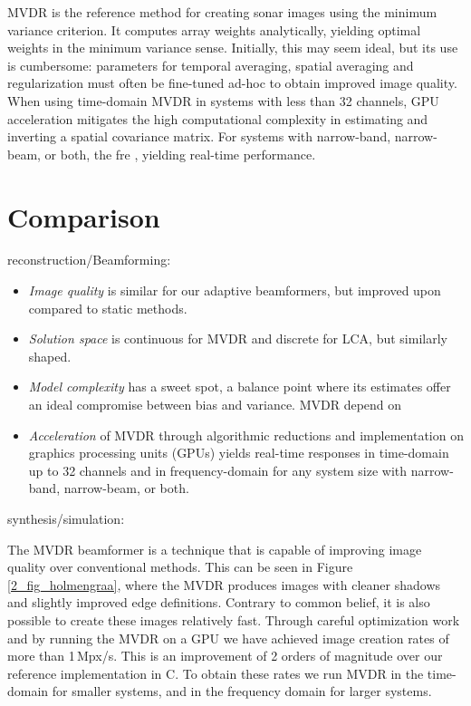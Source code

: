 MVDR is the reference method for creating sonar images using the minimum variance criterion. It computes array weights analytically, yielding optimal weights in the minimum variance sense. Initially, this may seem ideal, but its use is cumbersome: parameters for temporal averaging, spatial averaging and regularization must often be fine-tuned ad-hoc to obtain improved image quality. When using time-domain MVDR in systems with less than 32 channels, GPU acceleration mitigates the high computational complexity in estimating and inverting a spatial covariance matrix. For systems with narrow-band, narrow-beam, or both, the fre , yielding real-time performance.


\section{Comparison}

reconstruction/Beamforming:
%
\begin{itemize}
\item \emph{Image quality} is similar for our adaptive beamformers, but improved upon compared to static methods.
%
\item \emph{Solution space} is continuous for MVDR and discrete for LCA, but similarly shaped. 
%
\item \emph{Model complexity} has a sweet spot, a balance point where its estimates offer an ideal compromise between bias and variance. MVDR depend on 
%
\item \emph{Acceleration} of MVDR through algorithmic reductions and implementation on graphics processing units (GPUs) yields real-time responses in time-domain up to 32 channels and in frequency-domain for any system size with narrow-band, narrow-beam, or both.
\end{itemize}

synthesis/simulation:




The MVDR beamformer is a technique that is capable of improving image quality over conventional methods. This can be seen in Figure \ref{2_fig_holmengraa}, where the MVDR produces images with cleaner shadows and slightly improved edge definitions. Contrary to common belief, it is also possible to create these images relatively fast. Through careful optimization work and by running the MVDR on a GPU we have achieved image creation rates of more than 1\,Mpx/s. This is an improvement of 2 orders of magnitude over our reference implementation in C. To obtain these rates we run MVDR in the time-domain for smaller systems, and in the frequency domain for larger systems.

